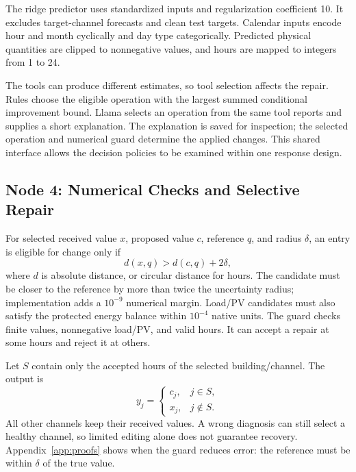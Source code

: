 \documentclass[conference]{IEEEtran}
\begin{document}
The ridge predictor uses standardized inputs and regularization coefficient 10. It excludes target-channel forecasts and clean test targets. Calendar inputs encode hour and month cyclically and day type categorically. Predicted physical quantities are clipped to nonnegative values, and hours are mapped to integers from 1 to 24.

The tools can produce different estimates, so tool selection affects the repair. Rules choose the eligible operation with the largest summed conditional improvement bound. Llama selects an operation from the same tool reports and supplies a short explanation. The explanation is saved for inspection; the selected operation and numerical guard determine the applied changes. This shared interface allows the decision policies to be examined within one response design.

\subsection{Node 4: Numerical Checks and Selective Repair}

For selected received value $x$, proposed value $c$, reference $q$, and radius $\delta$, an entry is eligible for change only if
\begin{equation}
 d(x,q)>d(c,q)+2\delta,
\label{eq:gate}
\end{equation}
where $d$ is absolute distance, or circular distance for hours. The candidate must be closer to the reference by more than twice the uncertainty radius; implementation adds a $10^{-9}$ numerical margin. Load/PV candidates must also satisfy the protected energy balance within $10^{-4}$ native units. The guard checks finite values, nonnegative load/PV, and valid hours. It can accept a repair at some hours and reject it at others.

Let $S$ contain only the accepted hours of the selected building/channel. The output is
\begin{equation}
 y_j=\begin{cases}c_j,&j\in S,\\x_j,&j\notin S.\end{cases}
\label{eq:sparse}
\end{equation}
All other channels keep their received values. A wrong diagnosis can still select a healthy channel, so limited editing alone does not guarantee recovery. Appendix~\ref{app:proofs} shows when the guard reduces error: the reference must be within $\delta$ of the true value.
\end{document}
